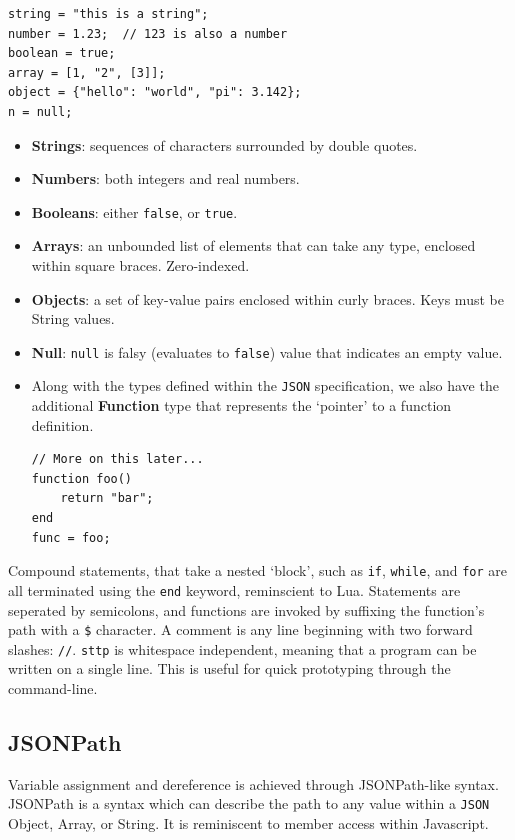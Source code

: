 \documentclass[]{full}
\theoremstyle{definition}
\begin{document}
\begin{verbatim}
string = "this is a string";
number = 1.23;  // 123 is also a number
boolean = true;
array = [1, "2", [3]];
object = {"hello": "world", "pi": 3.142};
n = null;
\end{verbatim}

\begin{itemize}
    \item \textbf{Strings}: sequences of characters surrounded by double quotes.
    \item \textbf{Numbers}: both integers and real numbers.
    \item \textbf{Booleans}: either \verb|false|, or \verb|true|.
    \item \textbf{Arrays}: an unbounded list of elements that can take any type, enclosed within square braces. Zero-indexed.
    \item \textbf{Objects}: a set of key-value pairs enclosed within curly braces. Keys must be String values.
    \item \textbf{Null}: \verb|null| is falsy (evaluates to \verb|false|) value that indicates an empty value.
    \item Along with the types defined within the \verb|JSON| specification, we also have the additional \textbf{Function} type that represents the `pointer' to a function definition.
    \begin{verbatim}
// More on this later...
function foo()
    return "bar";
end
func = foo;    
    \end{verbatim}
\end{itemize}

Compound statements, that take a nested `block', such as \verb|if|, \verb|while|, and \verb|for| are all terminated using the \verb|end| keyword, reminscient to Lua. Statements are seperated by semicolons, and functions are invoked by suffixing the function's path with a \verb|$| character. A comment is any line beginning with two forward slashes: \verb|//|. \verb|sttp| is whitespace independent, meaning that a program can be written on a single line. This is useful for quick prototyping through the command-line.

\subsection{JSONPath}

Variable assignment and dereference is achieved through JSONPath-like syntax. JSONPath is a syntax which can describe the path to any value within a \verb|JSON| Object, Array, or String. It is reminiscent to member access within Javascript.
\end{document}
